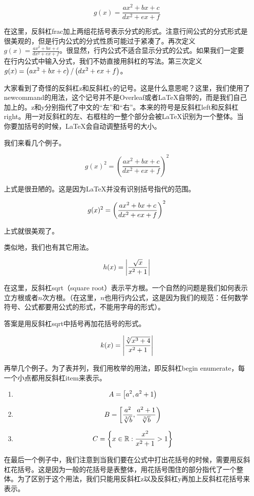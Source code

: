 \[ g(x)=\frac{ax^2+bx+c}{dx^2+ex+f}     \]

在这里，反斜杠frac加上两组花括号表示分式的形式。注意行间公式的分式形式是很美观的，但是行内公式的分式性质可能过于紧凑了。再次定义$g(x)=\frac{ax^2+bx+c}{dx^2+ex+f}$。很显然，行内公式不适合显示分式的公式。如果我们一定要在行内公式中输入分式，我们不妨直接用斜杠的写法。第三次定义$g(x)=\left(ax^2+bx+c\right)/\left(dx^2+ex+f\right)$。

大家看到了奇怪的反斜杠z和反斜杠y的记号。这是什么意思呢？这里，我们使用了newcommand的用法，这个记号并不是Overleaf或者LaTeX自带的，而是我们自己加上的。z和y分别指代了中文的“左”和“右”。本来的符号是反斜杠left和反斜杠right。用一对反斜杠的左、右框柱的一整个部分会被LaTeX识别为一个整体。当你要加括号的时候，LaTeX会自动调整括号的大小。

我们来看几个例子。

\[  g(x)^2=(\frac{ax^2+bx+c}{dx^2+ex+f})^2    \]

上式是很丑陋的。这是因为LaTeX并没有识别括号指代的范围。

\[ g(x)^2=\left(\frac{ax^2+bx+c}{dx^2+ex+f}\right)^2     \]

上式就很美观了。

类似地，我们也有其它用法。

\[  h(x)=\left| \frac{\sqrt{x}}{x^2+1} \right|    \]

在这里，反斜杠sqrt（square root）表示平方根。一个自然的问题是我们如何表示立方根或者$n$次方根。（在这里，$n$也用行内公式，这是因为我们的规范：任何数学符号、公式都要用公式的形式，不能用字母的形式）。

答案是用反斜杠sqrt中括号再加花括号的形式。

\[  k(x)=\left| \frac{\sqrt[5]{x^3+4}}{x^2+1} \right|    \]

再举几个例子。为了表并列，我们用枚举的用法，即反斜杠begin enumerate，每一个小点都用反斜杠item来表示。

\begin{enumerate}
    \item 
    \[  A=\left[a^2,a^2+1\right)    \]
    
    \item 
    \[ B=\left[\frac{a^2}{\sqrt[3]{b}},\frac{a^2+1}{\sqrt[3]{b}}\right) \]
    
    \item
    \[ C=\left\{x\in\mathbb{R}: \frac{x^2}{x^2+1}>1 \right\}    \]
\end{enumerate}

在最后一个例子中，我们注意到当我们要在公式中打出花括号的时候，需要用反斜杠花括号。这是因为一般的花括号是表整体，用花括号围住的部分指代了一个整体。为了区别于这个用法，我们只能用反斜杠z以及反斜杠y再加上反斜杠花括号来表示。

